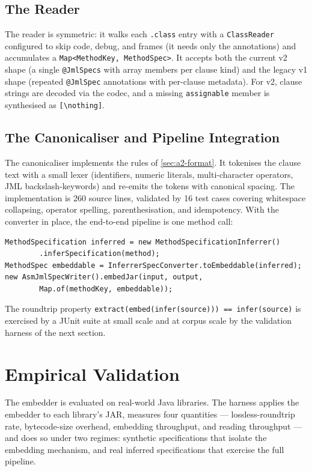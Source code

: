 \subsection{The Reader}

The reader is symmetric: it walks each \texttt{.class} entry with a
\texttt{ClassReader} configured to skip code, debug, and frames (it needs only
the annotations) and accumulates a \texttt{Map<MethodKey, MethodSpec>}. It
accepts both the current v2 shape (a single \texttt{@JmlSpecs} with array members
per clause kind) and the legacy v1 shape (repeated \texttt{@JmlSpec} annotations
with per-clause metadata). For v2, clause strings are decoded via the codec, and
a missing \texttt{assignable} member is synthesised as
\texttt{[\textbackslash nothing]}.

\subsection{The Canonicaliser and Pipeline Integration}

The canonicaliser implements the rules of \cref{sec:a2-format}. It tokenises the
clause text with a small lexer (identifiers, numeric literals, multi-character
operators, JML backslash-keywords) and re-emits the tokens with canonical
spacing. The implementation is 260 source lines, validated by 16 test cases
covering whitespace collapsing, operator spelling, parenthesisation, and
idempotency. With the converter in place, the end-to-end pipeline is one method
call:

\begin{lstlisting}
MethodSpecification inferred = new MethodSpecificationInferrer()
        .inferSpecification(method);
MethodSpec embeddable = InferrerSpecConverter.toEmbeddable(inferred);
new AsmJmlSpecWriter().embedJar(input, output,
        Map.of(methodKey, embeddable));
\end{lstlisting}

The roundtrip property
\texttt{extract(embed(infer(source))) == infer(source)} is exercised by a JUnit
suite at small scale and at corpus scale by the validation harness of the next
section.

\section{Empirical Validation}
\label{sec:a2-empirical}

The embedder is evaluated on real-world Java libraries. The harness applies the
embedder to each library's JAR, measures four quantities --- lossless-roundtrip
rate, bytecode-size overhead, embedding throughput, and reading throughput ---
and does so under two regimes: synthetic specifications that isolate the
embedding mechanism, and real inferred specifications that exercise the full
pipeline.

